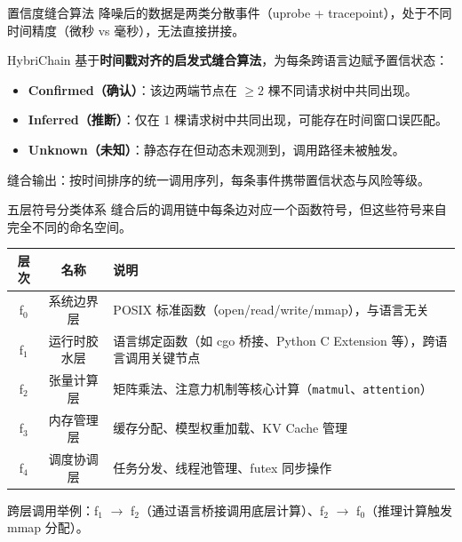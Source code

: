 \documentclass[aspectratio=169, 10pt]{beamer}
\begin{document}
\begin{frame}{置信度缝合算法}
    降噪后的数据是两类分散事件（uprobe + tracepoint），处于不同时间精度（微秒 vs 毫秒），无法直接拼接。

    HybriChain 基于\textbf{时间戳对齐的启发式缝合算法}，为每条跨语言边赋予置信状态：

    \begin{itemize}
        \item \textbf{Confirmed（确认）}：该边两端节点在 $\geq 2$ 棵不同请求树中共同出现。
        \item \textbf{Inferred（推断）}：仅在 1 棵请求树中共同出现，可能存在时间窗口误匹配。
        \item \textbf{Unknown（未知）}：静态存在但动态未观测到，调用路径未被触发。
    \end{itemize}

    \vspace{0.5em}
    缝合输出：按时间排序的统一调用序列，每条事件携带置信状态与风险等级。
\end{frame}

\begin{frame}{五层符号分类体系}
    缝合后的调用链中每条边对应一个函数符号，但这些符号来自完全不同的命名空间。

    \begin{table}[]
        \small
        \begin{tabular}{|c|c|p{6.5cm}|}
            \hline
            \textbf{层次} & \textbf{名称} & \textbf{说明} \\ \hline
            f$_0$ & 系统边界层 & POSIX 标准函数（open/read/write/mmap），与语言无关 \\ \hline
            f$_1$ & 运行时胶水层 & 语言绑定函数（如 cgo 桥接、Python C Extension 等），跨语言调用关键节点 \\ \hline
            f$_2$ & 张量计算层 & 矩阵乘法、注意力机制等核心计算（\texttt{matmul}、\texttt{attention}） \\ \hline
            f$_3$ & 内存管理层 & 缓存分配、模型权重加载、KV Cache 管理 \\ \hline
            f$_4$ & 调度协调层 & 任务分发、线程池管理、futex 同步操作 \\ \hline
        \end{tabular}
    \end{table}

    \vspace{0.5em}
    跨层调用举例：f$_1$ $\to$ f$_2$（通过语言桥接调用底层计算）、f$_2$ $\to$ f$_0$（推理计算触发 mmap 分配）。
\end{frame}
\end{document}
